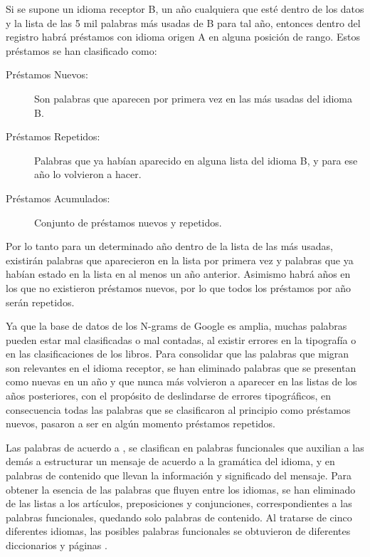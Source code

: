 Si se supone un idioma receptor B, un año cualquiera que esté dentro de los datos y  la lista  de las 5 mil palabras más usadas de B para tal año, entonces dentro del registro habrá préstamos con idioma  origen A en alguna posición de rango.  Estos préstamos se han clasificado como:


\begin{description}

	\item [Préstamos Nuevos:] Son palabras que aparecen por primera vez en las más usadas del idioma B.
	
	\item [Préstamos Repetidos:] Palabras que ya habían aparecido en alguna lista del idioma B, y para ese año lo volvieron a hacer.
	
	\item [Préstamos Acumulados:] Conjunto de préstamos nuevos y repetidos.
	
	
\end{description}


Por lo tanto para un determinado año dentro de la lista de las más usadas, existirán palabras que aparecieron en la lista por primera vez y palabras que ya habían estado en la lista en al menos un año anterior.  Asimismo  habrá años en los que no existieron préstamos nuevos,  por lo que todos los préstamos por año serán repetidos.

Ya que la base de datos de los N-grams de Google es amplia, muchas palabras pueden estar mal clasificadas o mal contadas, al existir errores en la tipografía o en las clasificaciones de los libros.  Para consolidar que las palabras que migran son relevantes en el idioma receptor, se han eliminado palabras que se presentan como nuevas en un año y que nunca más volvieron a aparecer en las listas de los años posteriores,  con el propósito de deslindarse de errores tipográficos, en consecuencia todas  las palabras que se clasificaron al principio como préstamos nuevos, pasaron a ser en algún momento préstamos repetidos. 

Las palabras de acuerdo a  \cite{contenidopal}, se clasifican en palabras funcionales que auxilian a las demás a estructurar un mensaje de acuerdo a la gramática del idioma, y en palabras de contenido que llevan la información y significado del mensaje. Para obtener la esencia de las palabras que fluyen entre los idiomas, se han eliminado de las listas a los artículos, preposiciones y conjunciones, correspondientes a las palabras funcionales, quedando solo palabras de contenido.  Al tratarse de cinco diferentes idiomas, las posibles palabras funcionales se obtuvieron de diferentes diccionarios y páginas \cite{englishdic, frenchdic, germandic, italiandic, spanishdic}.

